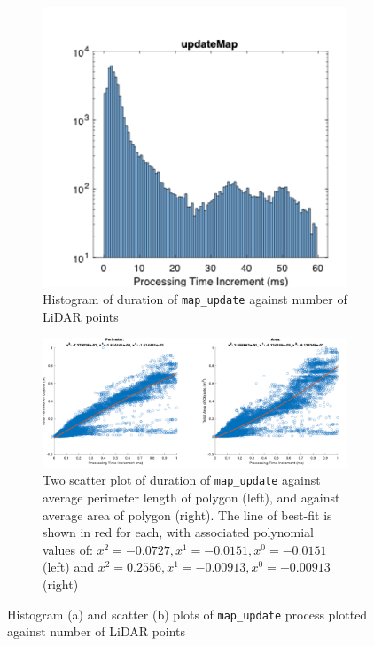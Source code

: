 \documentclass{erauthesis}
\begin{document}
\begin{figure}[htbp]
    \centering
    \begin{subfigure}[b]{0.44\linewidth}
        \centering
        \includegraphics[width=\linewidth]{Images/gbcache/Update_Map_hist.png}
        \caption{Histogram of duration of \texttt{map\_update} against number of LiDAR points}
        \label{fig:gbcache_update_map_hist}
    \end{subfigure}
    \vspace{1em} %
    \begin{subfigure}[b]{0.8\linewidth}
        \centering
        \includegraphics[width=\linewidth]{Images/gbcache/Update_Map_scatter.png}
        \caption{Two scatter plot of duration of \texttt{map\_update} against average perimeter length of polygon (left), and against average area of polygon (right). The line of best-fit is shown in red for each, with associated polynomial values of: $x^2 = -0.0727, x^1 = -0.0151, x^0 = -0.0151$ (left) and $x^2 = 0.2556, x^1 = -0.00913, x^0 = -0.00913$ (right) }
        \label{fig:gbcache_update_map_scatter}
    \end{subfigure}

    \caption{Histogram (a) and scatter (b) plots of \texttt{map\_update} process plotted against number of LiDAR points}
    \label{fig:gbcache_update_map}
\end{figure}
\end{document}
